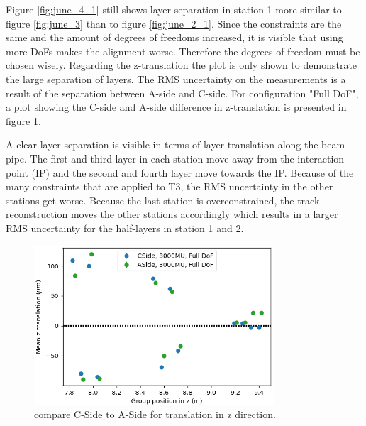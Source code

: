 Figure \ref{fig:june_4_1} still shows layer separation in station 1 more similar to figure \ref{fig:june_3} than to figure \ref{fig:june_2_1}.
Since the constraints are the same and the amount of degrees of freedoms increased,
it is visible that using more DoFs makes the alignment worse. Therefore the degrees of freedom must be chosen wisely.
Regarding the z-translation the plot is only shown to demonstrate the large separation of layers.
The RMS uncertainty on the measurements is a result of the separation between A-side and C-side. For configuration "Full DoF", a plot showing the C-side and A-side difference in z-translation is presented in figure \ref{fig:june_6}.

A clear layer separation is visible in terms of layer translation along the beam pipe.
The first and third layer in each station move away from the interaction point (IP) and the second and fourth layer move towards the IP.
Because of the many constraints that are applied to T3, the RMS uncertainty in the other stations get worse. Because the last station is overconstrained, the track reconstruction moves the other stations accordingly which results in a larger RMS uncertainty for the half-layers in station 1 and 2.

\begin{figure}[!ht]
  \centering
  \includegraphics[width=0.8\textwidth]{plots/renewed_plots/CA_allT_halfT3_Tz.png}
  \caption{compare C-Side to A-Side for translation in z direction.}
  \label{fig:june_6}
\end{figure}


